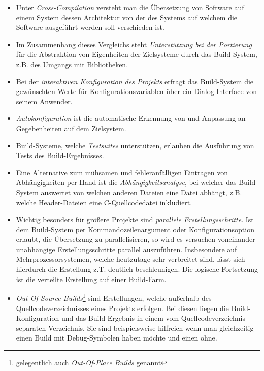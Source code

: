\begin{itemize}
%
\item Unter \emph{Cross-Compilation} versteht man die Übersetzung von Software
auf einem System dessen Architektur von der des Systems auf welchem die Software
ausgeführt werden soll verschieden ist.
%
\item Im Zusammenhang dieses Vergleichs steht \emph{Unterstützung bei der
Portierung} für die Abstraktion von Eigenheiten der Zielsysteme durch das
Build-System, z.B. des Umgangs mit Bibliotheken.
%
\item Bei der \emph{interaktiven Konfiguration des Projekts} erfragt das
Build-System die gewünschten Werte für Konfigurationsvariablen über ein
Dialog-Interface von seinem Anwender.
%
\item \emph{Autokonfiguration} ist die automatische Erkennung von und Anpassung
an Gegebenheiten auf dem Zielsystem.
%
\item Build-Systeme, welche \emph{Testsuites} unterstützen, erlauben die
Ausführung von Tests des Build-Ergebnisses.
%
%
\item Eine Alternative zum mühsamen und fehleranfälligen Eintragen von
Abhängigkeiten per Hand ist die \emph{Abhängigkeitsanalyse}, bei welcher das
Build-System auswertet von welchen anderen Dateien eine Datei abhängt, z.B.
welche Header-Dateien eine C-Quellcodedatei inkludiert.
%
\item Wichtig besonders für größere Projekte sind \emph{parallele
Erstellungsschritte}. Ist dem Build-System per Kommandozeilenargument oder
Konfigurationsoption erlaubt, die Übersetzung zu parallelisieren, so wird es
versuchen voneinander unabhängige Erstellungsschritte parallel auszuführen.
Insbesondere auf Mehrprozessorsystemen, welche heutzutage sehr verbreitet sind,
lässt sich hierdurch die Erstellung z.T. deutlich beschleunigen. Die logische
Fortsetzung ist die verteilte Erstellung auf einer Build-Farm.
%
\item \emph{Out-Of-Source Builds}\footnote{gelegentlich auch \emph{Out-Of-Place
Builds} genannt} sind Erstellungen, welche außerhalb des Quellcodeverzeichnisses
eines Projekts erfolgen. Bei diesen liegen die Build-Konfiguration und das
Build-Ergebnis in einem vom Quellcodeverzeichnis separaten Verzeichnis. Sie sind
beispielsweise hilfreich wenn man gleichzeitig einen Build mit Debug-Symbolen
haben möchte und einen ohne.
%
\end{itemize}
